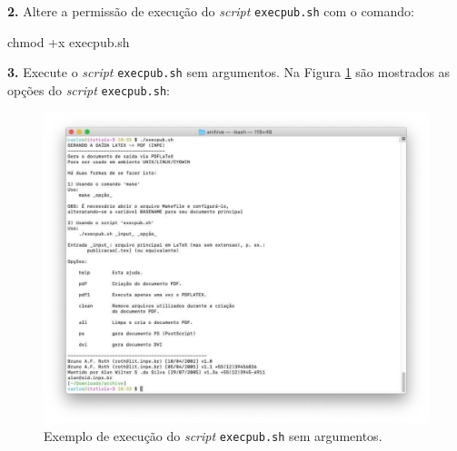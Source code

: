 \textbf{2.} Altere a permissão de execução do \textit{script} {\tt execpub.sh} com o comando:

\begin{meucomando}
chmod +x execpub.sh
\end{meucomando}

\textbf{3.} Execute o \textit{script} {\tt execpub.sh} sem argumentos. Na Figura \ref{fig:execpub} são mostrados as opções do \textit{script} {\tt execpub.sh}: 


\begin{figure}[H]
\caption{Exemplo de execução do \textit{script} {\tt execpub.sh} sem argumentos.}
\vspace{6mm}
    \begin{center}
        \includegraphics[scale=0.4]{./docs/figs/saida_execpub.pdf}
    \end{center}
\vspace{4mm}
\label{fig:execpub}
\end{figure}

